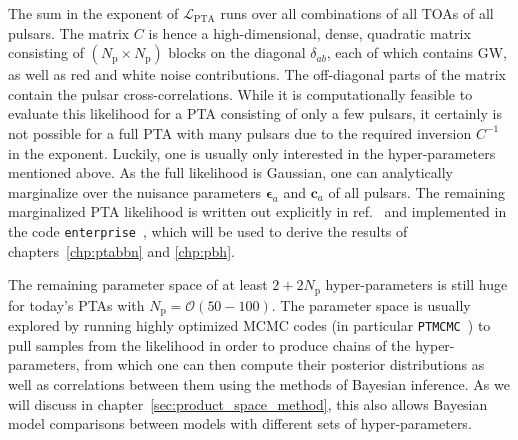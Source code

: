 The sum in the exponent of $\mathcal{L}_\text{PTA}$ runs over all combinations of all \acp{TOA} of all pulsars. The matrix $C$ is hence a high-dimensional, dense, quadratic matrix consisting of $(N_\text{p} \times N_\text{p})$ blocks on the diagonal $\delta_{ab}$, each of which contains \ac{GW}, as well as red and white noise contributions. The off-diagonal parts of the matrix  contain the pulsar cross-correlations. While it is computationally feasible to evaluate this likelihood for a \ac{PTA} consisting of only a few pulsars, it certainly is not possible for a full \ac{PTA} with many pulsars due to the required inversion $C^{-1}$ in the exponent. Luckily, one is usually only interested in the hyper-parameters mentioned above. As the full likelihood is Gaussian, one can analytically marginalize over the nuisance parameters $\bm{\epsilon}_a$ and $\bm{c}_a$ of all pulsars. The remaining marginalized \ac{PTA} likelihood is written out explicitly in ref.~\cite{Taylor:2021yjx} and implemented in the code \texttt{enterprise}~\cite{enterprise, enterprise2}, which will be used to derive the results of chapters~\ref{chp:ptabbn} and \ref{chp:pbh}.

The remaining parameter space of at least $2 + 2 N_\text{p}$ hyper-parameters is still huge for today's \acp{PTA} with $N_\text{p} = \mathcal{O}(50-100)$. The parameter space is usually explored by running highly optimized \acs{MCMC} codes (in particular \texttt{PTMCMC}~\cite{justin_ellis_2017_1037579}) to pull samples from the  likelihood in order to produce chains of the hyper-parameters, from which one can then compute their posterior distributions as well as correlations between them using the methods of Bayesian inference. As we will discuss in chapter~\ref{sec:product_space_method}, this also allows Bayesian model comparisons between models with different sets of hyper-parameters.

